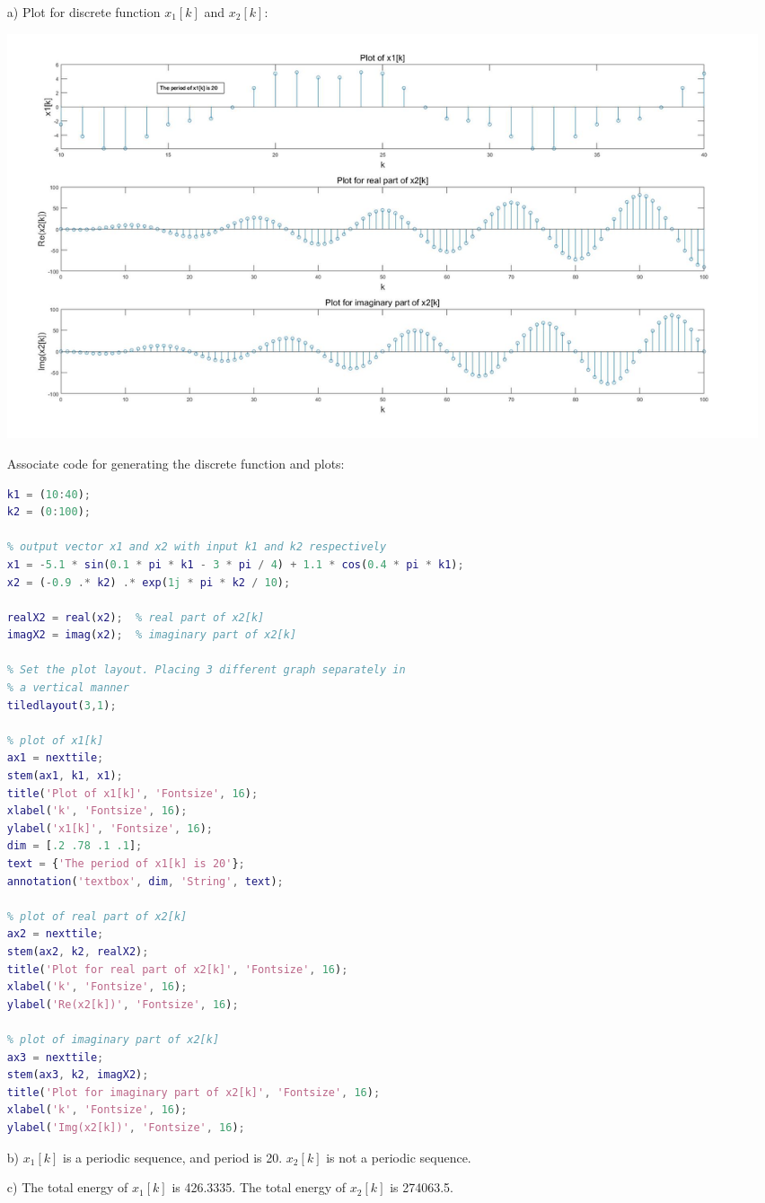 \documentclass{article}
\begin{document}
	\begin{enumerate}
		\item[a)] Plot for discrete function $x_1[k]$ and $x_2[k]$:
		
		\includegraphics[width=\textwidth]{Q1Plot.jpg}
		
		Associate code for generating the discrete function and plots:
\begin{lstlisting}[language=Matlab]
% initialize input vector for k1 and k2
k1 = (10:40);
k2 = (0:100);

% output vector x1 and x2 with input k1 and k2 respectively
x1 = -5.1 * sin(0.1 * pi * k1 - 3 * pi / 4) + 1.1 * cos(0.4 * pi * k1);
x2 = (-0.9 .* k2) .* exp(1j * pi * k2 / 10);

realX2 = real(x2);  % real part of x2[k]
imagX2 = imag(x2);  % imaginary part of x2[k]

% Set the plot layout. Placing 3 different graph separately in 
% a vertical manner
tiledlayout(3,1);

% plot of x1[k]
ax1 = nexttile;
stem(ax1, k1, x1);
title('Plot of x1[k]', 'Fontsize', 16);
xlabel('k', 'Fontsize', 16);
ylabel('x1[k]', 'Fontsize', 16);
dim = [.2 .78 .1 .1];
text = {'The period of x1[k] is 20'};
annotation('textbox', dim, 'String', text);

% plot of real part of x2[k]
ax2 = nexttile;
stem(ax2, k2, realX2);
title('Plot for real part of x2[k]', 'Fontsize', 16);
xlabel('k', 'Fontsize', 16);
ylabel('Re(x2[k])', 'Fontsize', 16);

% plot of imaginary part of x2[k]
ax3 = nexttile;
stem(ax3, k2, imagX2);
title('Plot for imaginary part of x2[k]', 'Fontsize', 16);
xlabel('k', 'Fontsize', 16);
ylabel('Img(x2[k])', 'Fontsize', 16);
\end{lstlisting}
		
		\item[b)] $x_1[k]$ is a periodic sequence, and period is 20. $x_2[k]$ is not a periodic sequence.
		
		\item[c)] The total energy of $x_1[k]$ is 426.3335. The total energy of $x_2[k]$ is 274063.5.
	\end{enumerate}
	
\end{document}
